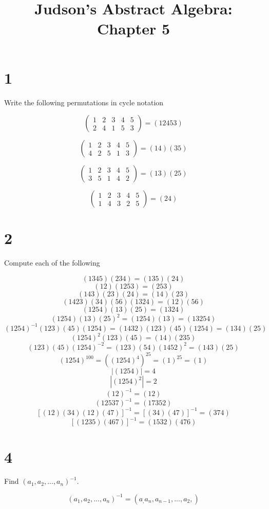 \documentclass[a4paper]{article}
\title{Judson's Abstract Algebra: Chapter 5}
\date{}
\begin{document}
\maketitle

\section*{1}

Write the following permutations in cycle notation

$$
\begin{pmatrix}
1 & 2 & 3 & 4 & 5 \\
2 & 4 & 1 & 5 & 3
\end{pmatrix}
= (12453)$$

$$
\begin{pmatrix}
1 & 2 & 3 & 4 & 5 \\
4 & 2 & 5 & 1 & 3
\end{pmatrix}
= (14)(35)$$

$$
\begin{pmatrix}
1 & 2 & 3 & 4 & 5 \\
3 & 5 & 1 & 4 & 2
\end{pmatrix}
= (13)(25)$$

$$
\begin{pmatrix}
1 & 2 & 3 & 4 & 5 \\
1 & 4 & 3 & 2 & 5
\end{pmatrix}
= (24)$$


\section*{2}

Compute each of the following

$$(1345)(234) = (135)(24)$$
$$(12)(1253) = (253)$$
$$(143)(23)(24) = (14)(23)$$
$$(1423)(34)(56)(1324) = (12)(56)$$
$$(1254)(13)(25) = (1324)$$
$$(1254)(13)(25)^2 = (1254)(13) = (13254)$$
$$(1254)^{-1}(123)(45)(1254) = (1432)(123)(45)(1254) = (134)(25)$$
$$(1254)^2(123)(45) = (14)(235)$$
$$(123)(45)(1254)^{-2} = (123)(54)(1452)^2 = (143)(25)$$
$$(1254)^{100} = ((1254)^4)^{25} = (1)^{25} = (1)$$
$$|(1254)| = 4$$
$$|(1254)^2| = 2$$
$$(12)^{-1} = (12)$$
$$(12537)^{-1} = (17352)$$
$$[(12)(34)(12)(47)]^{-1} = [(34)(47)]^{-1} = (374)$$
$$[(1235)(467)]^{-1} = (1532)(476)$$



\section*{4}

Find $(a_1, a_2, ..., a_n)^{-1}$.

$$(a_1, a_2, ..., a_n)^{-1} = (a_, a_n, a_{n-1}, ..., a_2,)$$
\end{document}
